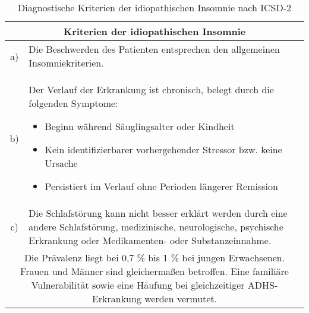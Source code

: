 \begin{table}[H] 
\centering
\begin{tabularx}{\textwidth}{cX}
\toprule
\multicolumn{2}{c}{\textbf{Kriterien der idiopathischen Insomnie}}\\
\midrule 
a) & Die Beschwerden des Patienten entsprechen den allgemeinen Insomniekriterien.\\
b) & Der Verlauf der Erkrankung ist chronisch, belegt durch die folgenden Symptome:
\begin{itemize}
\singlespacing
\setlength\itemsep{0em}
\item Beginn während Säuglingsalter oder Kindheit
\item Kein identifizierbarer vorhergehender Stressor bzw. keine Ursache
\item Persistiert im Verlauf ohne Perioden längerer Remission
\end{itemize}\\
c) & Die Schlafstörung kann nicht besser erklärt werden durch eine andere Schlafstörung, medizinische, neurologische, psychische Erkrankung oder Medikamenten- oder Substanzeinnahme.\\
\midrule
\multicolumn{2}{p{0.97\textwidth}}{Die Prävalenz liegt bei 0,7 \% bis 1 \% bei jungen Erwachsenen. Frauen und Männer sind gleichermaßen betroffen. Eine familiäre Vulnerabilität sowie eine Häufung bei gleichzeitiger ADHS-Erkrankung werden vermutet.}\\
\bottomrule
\end{tabularx}
\caption[Kriterien der idiopathischen Insomnie]{Diagnostische Kriterien der idiopathischen Insomnie nach \acs{ICSD-2} \parencite{mayer_s3-leitlinie_2009, happe_schlafmedizin_2009}}
\label{tab:idiopathische_insomnie}
\end{table}



\newpage


